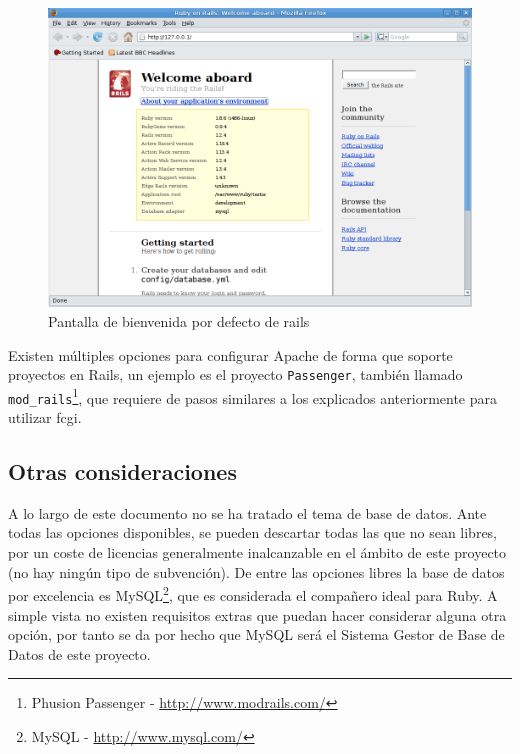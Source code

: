 \begin{figure}[ht]
\centering
\includegraphics[width=16cm]{rubyapache.png}
\caption{Pantalla de bienvenida por defecto de rails}\label{fig:rubyapache}
\end{figure}

Existen múltiples opciones para configurar Apache de forma que soporte proyectos en Rails, un ejemplo es el proyecto \texttt{Passenger}, también llamado \texttt{mod\_rails}\footnote{Phusion Passenger - \url{http://www.modrails.com/}}, que requiere de pasos similares a los explicados anteriormente para utilizar fcgi.

\subsection{Otras consideraciones}
A lo largo de este documento no se ha tratado el tema de base de datos. Ante todas las opciones disponibles, se pueden descartar todas las que no sean libres, por un coste de licencias generalmente inalcanzable en el ámbito de este proyecto (no hay ningún tipo de subvención). De entre las opciones libres la base de datos por excelencia es MySQL\footnote{MySQL - \url{http://www.mysql.com/}}, que es considerada el compañero ideal para Ruby. A simple vista no existen requisitos extras que puedan hacer considerar alguna otra opción, por tanto se da por hecho que MySQL será el Sistema Gestor de Base de Datos de este proyecto.
